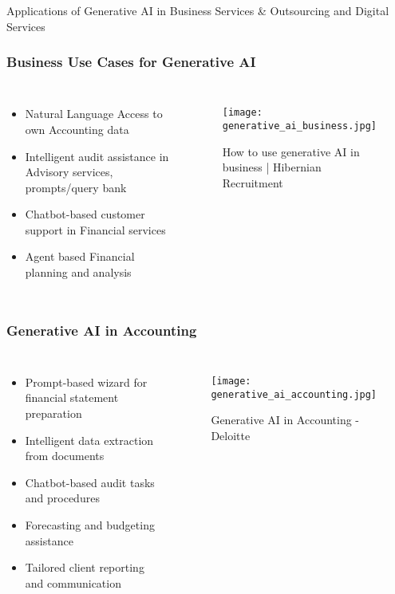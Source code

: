 \begin{frame}[fragile]\frametitle{}
\begin{center}
{\Large Applications of Generative AI in Business Services \& Outsourcing and Digital Services}
\end{center}
\end{frame}

\begin{frame}[fragile]\frametitle{Business Use Cases for Generative AI}
\begin{columns}
\begin{itemize}
    \item Natural Language Access to own Accounting data
    \item Intelligent audit assistance in Advisory services, prompts/query bank
    \item Chatbot-based customer support in Financial services
    \item Agent based Financial planning and analysis
\end{itemize}
\begin{figure}
    \texttt{[image: generative\_ai\_business.jpg]}
    \caption{How to use generative AI in business | Hibernian Recruitment}
\end{figure}
\end{columns}
\end{frame}

\begin{frame}[fragile]\frametitle{Generative AI in Accounting}
\begin{columns}
\begin{itemize}
    \item Prompt-based wizard for financial statement preparation
    \item Intelligent data extraction from documents
    \item Chatbot-based  audit tasks and procedures
    \item Forecasting and budgeting assistance
    \item Tailored client reporting and communication
\end{itemize}
\begin{figure}
    \texttt{[image: generative\_ai\_accounting.jpg]}
    \caption{Generative AI in Accounting - Deloitte}
\end{figure}
\end{columns}
\end{frame}

